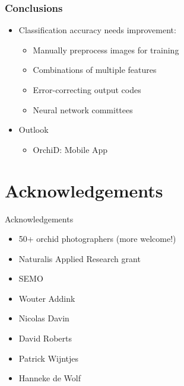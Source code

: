\documentclass[]{beamer}
\begin{document}
    \begin{frame}
        \frametitle{Conclusions}

        \begin{itemize}
            \item Classification accuracy needs improvement:
            \begin{itemize}
                \item Manually preprocess images for training
                \item Combinations of multiple features
                \item Error-correcting output codes
                \item Neural network committees
            \end{itemize}
        \end{itemize}

        \begin{itemize}
            \item Outlook
            \begin{itemize}
                \item OrchiD: Mobile App
            \end{itemize}
        \end{itemize}
    \end{frame}


\section*{Acknowledgements}

    \begin{frame}{Acknowledgements}
        \begin{itemize}
            \item 50+ orchid photographers (more welcome!)
            \item Naturalis Applied Research grant
            \item SEMO
            \item Wouter Addink
            \item Nicolas Davin
            \item David Roberts
            \item Patrick Wijntjes
            \item Hanneke de Wolf
        \end{itemize}
    \end{frame}
\end{document}
